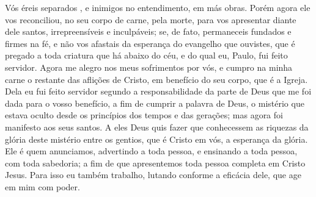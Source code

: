 {Vós éreis separados
{} , e inimigos no entendimento, em más obras. Porém agora ele vos reconciliou,
no seu corpo de carne, pela morte, para vos apresentar diante dele santos, irrepreensíveis e inculpáveis;
se, de fato, permaneceis fundados e firmes na fé, e não vos afastais da esperança do evangelho que ouvistes, que é pregado a toda criatura que há abaixo do céu, e do qual eu, Paulo, fui feito servidor.
Agora me alegro nos meus sofrimentos por vós, e cumpro na minha carne o restante das aflições de Cristo, em benefício do seu corpo, que é a Igreja.
Dela eu fui feito servidor segundo a responsabilidade da parte de Deus que me foi dada para o vosso benefício, a fim de cumprir a palavra de Deus,
o mistério que estava oculto desde os princípios dos tempos e das gerações; mas agora foi manifesto aos seus santos.
A eles Deus quis fazer que conhecessem as riquezas da glória deste mistério entre os gentios, que é Cristo em vós, a esperança da glória.
Ele é quem anunciamos, advertindo a toda pessoa, e ensinando a toda pessoa, com toda sabedoria; a fim de que apresentemos toda pessoa
{} completa em Cristo Jesus.
Para isso eu também trabalho, lutando conforme a eficácia dele, que age em mim com poder.

}
